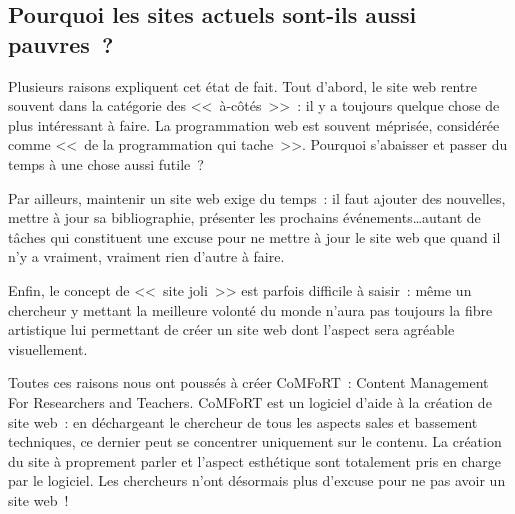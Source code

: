 \documentclass[final,11pt,a4paper,twoside,titlepage]{article}
\newcommand{\p}{\vspace{0.3em}}
\begin{document}
{  \subsection{Pourquoi les sites actuels sont-ils aussi pauvres~?}
    Plusieurs raisons expliquent cet état de fait. Tout d'abord, le site web
    rentre souvent dans la catégorie des <<~à-côtés~>>~: il y a toujours quelque
    chose de plus intéressant à faire. La programmation web est
    souvent méprisée, considérée comme <<~de la programmation qui tache~>>.
    Pourquoi s'abaisser et passer du temps à une chose aussi futile~? \p
    
    Par ailleurs, maintenir un site web exige du temps~: il faut ajouter des
    nouvelles, mettre à jour sa bibliographie, présenter les prochains
    événements\ldots autant de tâches qui constituent une excuse pour ne mettre
    à jour le site web que quand il n'y a vraiment, vraiment rien d'autre à
    faire. \p
    
    Enfin, le concept de <<~site joli~>> est parfois difficile à saisir~: même
    un chercheur y mettant la meilleure volonté du monde n'aura pas toujours la
    fibre artistique lui permettant de créer un site web dont l'aspect sera
    agréable visuellement. \p
    
    Toutes ces raisons nous ont poussés à créer CoMFoRT~: Content Management For
    Researchers and Teachers. CoMFoRT est un logiciel d'aide à la création de
    site web~: en déchargeant le chercheur de tous les aspects sales et
    bassement techniques, ce dernier peut se concentrer uniquement sur le
    contenu. La création du site à proprement parler et l'aspect esthétique
    sont totalement pris en charge par le logiciel. Les
    chercheurs n'ont désormais plus d'excuse pour ne pas avoir un site web~!

}
\end{document}
